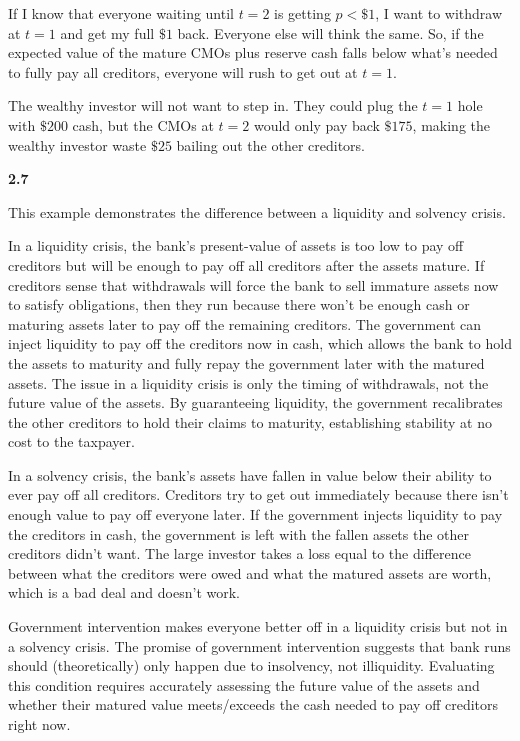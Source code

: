 \documentclass[11pt]{article}
\begin{document}
If I know that everyone waiting until $t = 2$ is getting $p < \$1$, I want to withdraw at $t = 1$ and get my full $\$1$ back. Everyone else will think the same. So, if the expected value of the mature CMOs plus reserve cash falls below what's needed to fully pay all creditors, everyone will rush to get out at $t = 1$.

The wealthy investor will not want to step in. They could plug the $t = 1$ hole with $\$200$ cash, but the CMOs at $t = 2$ would only pay back $\$175$, making the wealthy investor waste $\$25$ bailing out the other creditors.

\textbf{2.7}

This example demonstrates the difference between a liquidity and solvency crisis.

In a liquidity crisis, the bank's present-value of assets is too low to pay off creditors but will be enough to pay off all creditors after the assets mature. If creditors sense that withdrawals will force the bank to sell immature assets now to satisfy obligations, then they run because there won't be enough cash or maturing assets later to pay off the remaining creditors. The government can inject liquidity to pay off the creditors now in cash, which allows the bank to hold the assets to maturity and fully repay the government later with the matured assets. The issue in a liquidity crisis is only the timing of withdrawals, not the future value of the assets. By guaranteeing liquidity, the government recalibrates the other creditors to hold their claims to maturity, establishing stability at no cost to the taxpayer.  

In a solvency crisis, the bank's assets have fallen in value below their ability to ever pay off all creditors. Creditors try to get out immediately because there isn't enough value to pay off everyone later. If the government injects liquidity to pay the creditors in cash, the government is left with the fallen assets the other creditors didn't want. The large investor takes a loss equal to the difference between what the creditors were owed and what the matured assets are worth, which is a bad deal and doesn't work.

Government intervention makes everyone better off in a liquidity crisis but not in a solvency crisis. The promise of government intervention suggests that bank runs should (theoretically) only happen due to insolvency, not illiquidity. Evaluating this condition requires accurately assessing the future value of the assets and whether their matured value meets/exceeds the cash needed to pay off creditors right now. 
\end{document}
